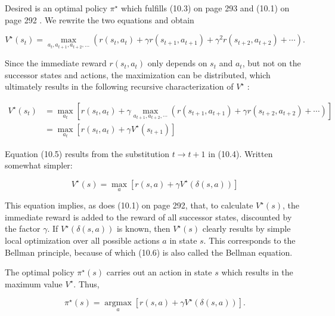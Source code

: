 \documentclass[10pt]{article}
\begin{document}
Desired is an optimal policy $\pi^{\star}$ which fulfills (10.3) on page 293 and (10.1) on page 292 . We rewrite the two equations and obtain


\begin{equation*}
V^{\star}\left(s_{t}\right)=\max _{a_{t}, a_{t+1}, a_{t+2}, \ldots}\left(r\left(s_{t}, a_{t}\right)+\gamma r\left(s_{t+1}, a_{t+1}\right)+\gamma^{2} r\left(s_{t+2}, a_{t+2}\right)+\cdots\right) . \tag{10.4}
\end{equation*}


Since the immediate reward $r\left(s_{t}, a_{t}\right)$ only depends on $s_{t}$ and $a_{t}$, but not on the successor states and actions, the maximization can be distributed, which ultimately results in the following recursive characterization of $V^{\star}$ :


\begin{align*}
V^{\star}\left(s_{t}\right) & =\max _{a_{t}}\left[r\left(s_{t}, a_{t}\right)+\gamma \max _{a_{t+1}, a_{t+2}, \cdots}\left(r\left(s_{t+1}, a_{t+1}\right)+\gamma r\left(s_{t+2}, a_{t+2}\right)+\cdots\right)\right] \\
& =\max _{a_{t}}\left[r\left(s_{t}, a_{t}\right)+\gamma V^{\star}\left(s_{t+1}\right)\right] \tag{10.5}
\end{align*}


Equation (10.5) results from the substitution $t \rightarrow t+1$ in (10.4). Written somewhat simpler:


\begin{equation*}
V^{\star}(s)=\max _{a}\left[r(s, a)+\gamma V^{\star}(\delta(s, a))\right] \tag{10.6}
\end{equation*}


This equation implies, as does (10.1) on page 292, that, to calculate $V^{\star}(s)$, the immediate reward is added to the reward of all successor states, discounted by the factor $\gamma$. If $V^{\star}(\delta(s, a))$ is known, then $V^{\star}(s)$ clearly results by simple local optimization over all possible actions $a$ in state $s$. This corresponds to the Bellman principle, because of which (10.6) is also called the Bellman equation.

The optimal policy $\pi^{\star}(s)$ carries out an action in state $s$ which results in the maximum value $V^{\star}$. Thus,


\begin{equation*}
\pi^{\star}(s)=\underset{a}{\operatorname{argmax}}\left[r(s, a)+\gamma V^{\star}(\delta(s, a))\right] . \tag{10.7}
\end{equation*}
\end{document}
